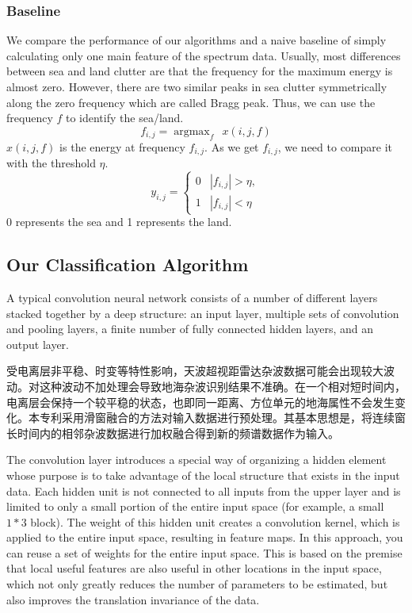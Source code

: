 \subsubsection{Baseline}
We compare the performance of our algorithms and a naive baseline of simply calculating only one main feature of the spectrum data. Usually, most differences between sea and land clutter are that the frequency for the maximum energy is almost zero. However, there are two similar peaks in sea clutter symmetrically along the zero frequency which are called Bragg peak. Thus, we can use the frequency $f$ to identify the sea/land.
\begin{equation}
f_{i, j}= \mathop{\arg\max}_{f} \ \ x(i, j, f)
\end{equation}
$x(i, j, f)$ is the energy at frequency $f_{i, j}$. As we get $f_{i, j}$, we need to compare it with the threshold $\eta$.
\[
y_{i, j}= \left\{\begin{array}{ll}
0&|f_{i, j}| > \eta, \\
1&|f_{i, j}| < \eta
\end{array}
\right.\]
0 represents the sea and 1 represents the land.
\subsection{Our Classification Algorithm}
A typical convolution neural network consists of a number of different layers stacked together by a deep structure: an input layer, multiple sets of convolution and pooling layers, a finite number of fully connected hidden layers, and an output layer.

受电离层非平稳、时变等特性影响，天波超视距雷达杂波数据可能会出现较大波动。对这种波动不加处理会导致地海杂波识别结果不准确。在一个相对短时间内，电离层会保持一个较平稳的状态，也即同一距离、方位单元的地海属性不会发生变化。本专利采用滑窗融合的方法对输入数据进行预处理。其基本思想是，将连续窗长时间内的相邻杂波数据进行加权融合得到新的频谱数据作为输入。

The convolution layer introduces a special way of organizing a hidden element whose purpose is to take advantage of the local structure that exists in the input data. Each hidden unit is not connected to all inputs from the upper layer and is limited to only a small portion of the entire input space (for example, a small $1*3$ block). The weight of this hidden unit creates a convolution kernel, which is applied to the entire input space, resulting in feature maps. In this approach, you can reuse a set of weights for the entire input space. This is based on the premise that local useful features are also useful in other locations in the input space, which not only greatly reduces the number of parameters to be estimated, but also improves the translation invariance of the data.


